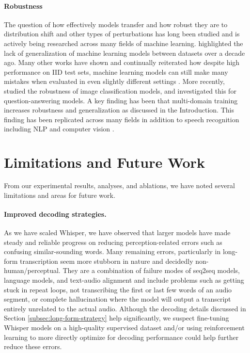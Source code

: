 \paragraph{Robustness} The question of how effectively models transfer and how robust they are to distribution shift and other types of perturbations has long been studied and is actively being researched across many fields of machine learning. \citet{torralba2011databias} highlighted the lack of generalization of machine learning models between datasets over a decade ago. Many other works have shown and continually reiterated how despite high performance on IID test sets, machine learning models can still make many mistakes when evaluated in even slightly different settings \cite{lake2017building,jia2017adversarial,alcorn2019strike,barbu2019objectnet,recht2019generalize}. More recently, \citet{taori2020robustness} studied the robustness of image classification models, and \citet{miller2020nlprobustness} investigated this for question-answering models. A key finding has been that multi-domain training increases robustness and generalization as discussed in the Introduction. This finding has been replicated across many fields in addition to speech recognition including NLP \cite{hendrycks2020pretrained} and computer vision \cite{radford2021clip}.

\section{Limitations and Future Work}\label{sec:future}

From our experimental results, analyses, and ablations, we have noted several limitations and areas for future work.

\paragraph{Improved decoding strategies.} As we have scaled Whisper, we have observed that larger models have made steady and reliable progress on reducing perception-related errors such as confusing similar-sounding words. Many remaining errors, particularly in long-form transcription seem more stubborn in nature and decidedly non-human/perceptual. They are a combination of failure modes of seq2seq models, language models, and text-audio alignment and include problems such as getting stuck in repeat loops, not transcribing the first or last few words of an audio segment, or complete hallucination where the model will output a transcript entirely unrelated to the actual audio. Although the decoding details discussed in Section \ref{subsec:long-form-strategy} help significantly, we suspect fine-tuning Whisper models on a high-quality supervised dataset and/or using reinforcement learning to more directly optimize for decoding performance could help further reduce these errors.

